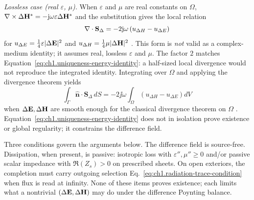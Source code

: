 \emph{Lossless case (real $\varepsilon$, $\mu$).} When $\varepsilon$ and $\mu$ are real constants on $\Omega$, $\nabla\times\Delta\mathbf{H}^*=-\mathrm{j}\omega\varepsilon\Delta\mathbf{H}^*$ and the substitution gives the local relation
\begin{equation}
\label{eq:ch1.uniqueness-local-div}
\nabla\cdot\mathbf{S}_\Delta=-2\mathrm{j}\omega\left(u_{\Delta H}-u_{\Delta E}\right)
\end{equation}
for $u_{\Delta E}=\tfrac14\varepsilon|\Delta\mathbf{E}|^{2}$ and $u_{\Delta H}=\tfrac14\mu|\Delta\mathbf{H}|^{2}$ \cite{stratton1941}. This form is \emph{not} valid as a complex-medium identity; it assumes real, lossless $\varepsilon$ and $\mu$. The factor $2$ matches Equation~\eqref{eq:ch1.uniqueness-energy-identity}: a half-sized local divergence would not reproduce the integrated identity. Integrating over $\Omega$ and applying the divergence theorem yields
\begin{equation}
\label{eq:ch1.uniqueness-energy-identity}
\int_{\Gamma}\hat{\mathbf{n}}\cdot\mathbf{S}_\Delta\,dS
=-2\jj\omega\!\int_{\Omega}\!\left(u_{\Delta H}-u_{\Delta E}\right)dV
\end{equation}
when $\Delta\mathbf{E},\Delta\mathbf{H}$ are smooth enough for the classical divergence theorem on $\Omega$ \cite{stratton1941}. Equation~\eqref{eq:ch1.uniqueness-energy-identity} does not in isolation prove existence or global regularity; it constrains the difference field.

Three conditions govern the arguments below. The difference field is source-free. Dissipation, when present, is passive: isotropic loss with $\varepsilon'',\mu''\ge0$ and/or passive scalar impedance with $\Re(Z_s)>0$ on prescribed sheets. On open exteriors, the completion must carry outgoing selection Eq.~\eqref{eq:ch1.radiation-trace-condition} when flux is read at infinity. None of these items proves existence; each limits what a nontrivial $(\Delta\mathbf{E},\Delta\mathbf{H})$ may do under the difference Poynting balance.

